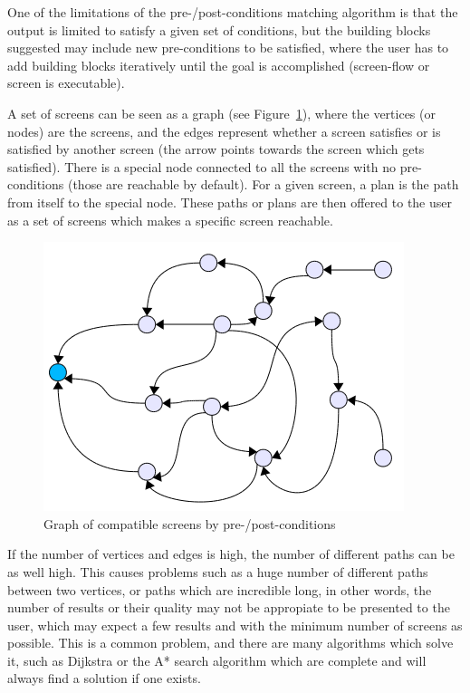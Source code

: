 \documentclass{fast_latex}
\begin{document}
One of the limitations of the pre-/post-conditions matching algorithm is that the output is limited to satisfy a given set of conditions, but the building blocks suggested may include new pre-conditions to be satisfied, where the user has to add building blocks iteratively until the goal is accomplished (screen-flow or screen is executable).

A set of screens can be seen as a graph (see Figure~\ref{fig:screens_graph}), where the vertices (or nodes) are the screens, and the edges represent whether a screen satisfies or is satisfied by another screen (the arrow points towards the screen which gets satisfied). There is a special node connected to all the screens with no pre-conditions (those are reachable by default). For a given screen, a plan is the path from itself to the special node. These paths or plans are then offered to the user as a set of screens which makes a specific screen reachable.

\begin{figure}[htb]
\label{fig:screens_graph}
\begin{center}
	\includegraphics{images/screens_graph}
	\caption{Graph of compatible screens by pre-/post-conditions}
\end{center}
\end{figure}

If the number of vertices and edges is high, the number of different paths can be as well high. This causes problems such as a huge number of different paths between two vertices, or paths which are incredible long, in other words, the number of results or their quality may not be appropiate to be presented to the user, which may expect a few results and with the minimum number of screens as possible. This is a common problem, and there  are many algorithms which solve it, such as Dijkstra or the A* search algorithm which are complete and will always find a solution if one exists.
\end{document}
